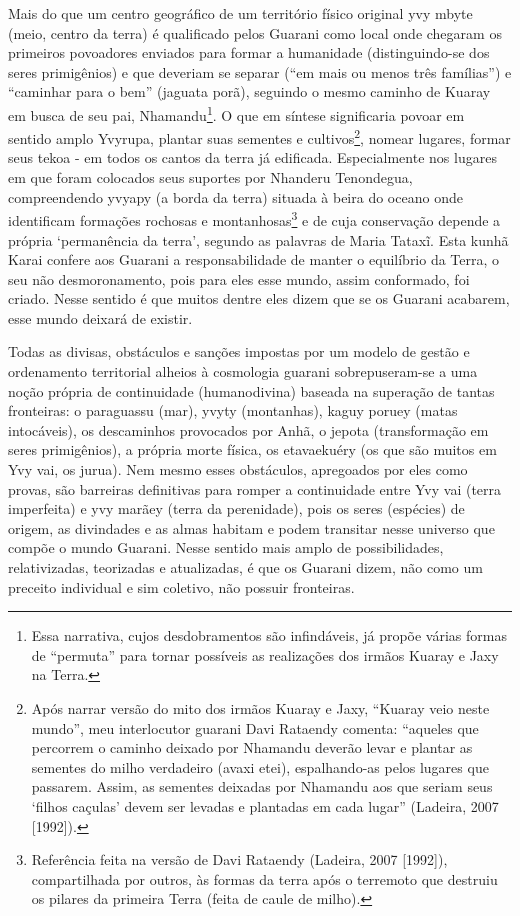 {{Mais do que um centro geográfico de um território físico original yvy
mbyte (meio, centro da terra) é qualificado pelos Guarani como local
onde chegaram os primeiros povoadores enviados para formar a humanidade
(distinguindo-se dos seres primigênios) e que deveriam se separar (``em
mais ou menos três famílias'') e ``caminhar para o bem'' (jaguata porã),
seguindo o mesmo caminho de Kuaray em busca de seu pai,
Nhamandu\footnote{Essa narrativa, cujos desdobramentos são infindáveis,
já propõe várias formas de ``permuta'' para tornar possíveis as
realizações dos irmãos Kuaray e Jaxy na Terra.}.  O que em síntese
significaria povoar em sentido amplo Yvyrupa, plantar suas sementes e
cultivos\footnote{Após narrar versão do mito dos irmãos Kuaray e Jaxy,
``Kuaray veio neste mundo'', meu interlocutor guarani Davi Rataendy
comenta: ``aqueles que percorrem o caminho deixado por Nhamandu deverão
levar e plantar as sementes do milho verdadeiro (avaxi etei),
espalhando-as pelos lugares que passarem. Assim, as sementes deixadas
por Nhamandu aos que seriam seus ‘filhos caçulas’ devem ser levadas e
plantadas em cada lugar'' (Ladeira, 2007 [1992]).}, nomear lugares,
formar seus tekoa - em todos os cantos da terra já edificada.
Especialmente nos lugares em que foram colocados seus suportes por
Nhanderu Tenondegua, compreendendo yvyapy (a borda da terra) situada à
beira do oceano onde identificam formações rochosas e
montanhosas\footnote{Referência feita na versão de Davi Rataendy
(Ladeira, 2007 [1992]), compartilhada por outros, às formas da terra
após o terremoto que destruiu os pilares da primeira Terra (feita de
caule de milho). } e de cuja conservação depende a própria ‘permanência
da terra’, segundo as palavras de Maria Tataxĩ.
Esta kunhã Karai confere aos Guarani a responsabilidade de manter o
equilíbrio da Terra, o seu não desmoronamento, pois para eles esse
mundo, assim conformado, foi criado. Nesse sentido é que muitos dentre
eles dizem que se os Guarani acabarem, esse mundo deixará de existir. 

Todas as divisas, obstáculos e sanções impostas por um modelo de gestão
e ordenamento territorial alheios à cosmologia guarani sobrepuseram-se
a uma noção própria de continuidade (humanodivina) baseada na superação
de tantas fronteiras: o paraguassu (mar), yvyty (montanhas), kaguy
poruey (matas intocáveis), os descaminhos provocados por Anhã, o jepota
(transformação em seres primigênios), a própria morte física, os
etavaekuéry (os que são muitos em Yvy vai, os jurua).  Nem mesmo esses
obstáculos, apregoados por eles como provas, são barreiras definitivas
para romper a continuidade entre Yvy vai (terra imperfeita) e yvy
marãey (terra da perenidade), pois os seres (espécies) de origem, as
divindades e as almas habitam e podem transitar nesse universo que
compõe o mundo Guarani. Nesse sentido mais amplo de possibilidades,
relativizadas, teorizadas e atualizadas, é que os Guarani dizem, não
como um preceito individual e sim coletivo, não possuir fronteiras. 

}}
